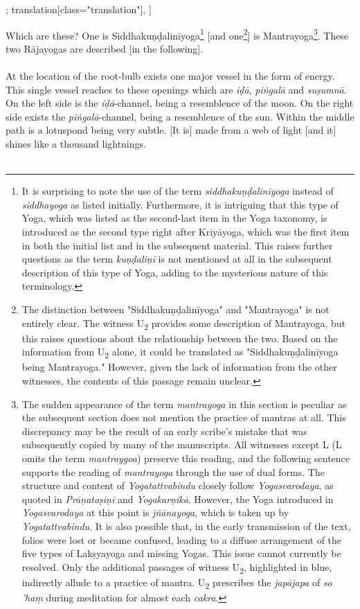 \begin{alignment}[
    texts=edition[class="edition"];
    translation[class="translation"],
  ]
\begin{translation}
\begin{tlate}
      \indent Which are these? One is Siddhakuṇḍalinīyoga\footnote{It is surprising to note the use of the term \textit{siddhakuṇḍalinīyoga} instead of \textit{siddhayoga} as listed initially. Furthermore, it is intriguing that this type of Yoga, which was listed as the second-last item in the Yoga taxonomy, is introduced as the second type right after Kriyāyoga, which was the first item in both the initial list and in the subsequent material. This raises further questions as the term \textit{kuṇḍaliṇī} is not mentioned at all in the subsequent description of this type of Yoga, adding to the mysterious nature of this terminology.} [and one\footnote{The distinction between "Siddhakuṇḍalinīyoga" and "Mantrayoga" is not entirely clear. The witness U\textsubscript{2} provides some description of Mantrayoga, but this raises questions about the relationship between the two. Based on the information from U\textsubscript{2} alone, it could be translated as "Siddhakuṇḍalinīyoga being Mantrayoga." However, given the lack of information from the other witnesses, the contents of this passage remain unclear.}] is Mantrayoga\footnote{The sudden appearance of the term \textit{mantrayoga} in this section is peculiar as the subsequent section does not mention the practice of mantras at all. This discrepancy may be the result of an early scribe's mistake that was subsequently copied by many of the manuscripts. All witnesses except L (L omits the term \textit{mantraygoa}) preserve this reading, and the following sentence supports the reading of \textit{mantrayoga} through the use of dual forms. The structure and content of \textit{Yogatattvabindu} closely follow \textit{Yogasvarodaya}, as quoted in \textit{Prāṇatoṣiṇī} and \textit{Yogakarṇikā}. However, the Yoga introduced in \textit{Yogasvarodaya} at this point is \textit{jñānayoga}, which is taken up by \textit{Yogatattvabindu}. It is also possible that, in the early transmission of the text, folios were lost or became confused, leading to a diffuse arrangement of the five types of Lakṣyayoga and missing Yogas. This issue cannot currently be resolved. Only the additional passages of witness U\textsubscript{2}, highlighted in blue, indirectly allude to a practice of mantra. U\textsubscript{2} prescribes the \textit{japājapa} of \textit{so 'haṃ} during meditation for almost each \textit{cakra}.}. These two Rājayogas are described [in the following]. \\\\
      \indent At the location of the root-bulb exists one major vessel in the form of energy.\textsuperscript{\coro{[\lowroman{5}]}} This single vessel reaches to these openings which are \textit{iḍā}, \textit{piṅgalā} and \textit{suṣumnā}. On the left side is the \textit{iḍā}-channel, being a resemblence of the moon. On the right side exists the \textit{piṅgalā}-channel, being a resemblence of the sun. Within the middle path is a lotuspond being very subtle.\textsuperscript{\coro{[\lowroman{10}]}} [It is] made from a web of light [and it] shines like a thousand lightnings.\\\\

\end{tlate}
\end{translation}
\end{alignment}
